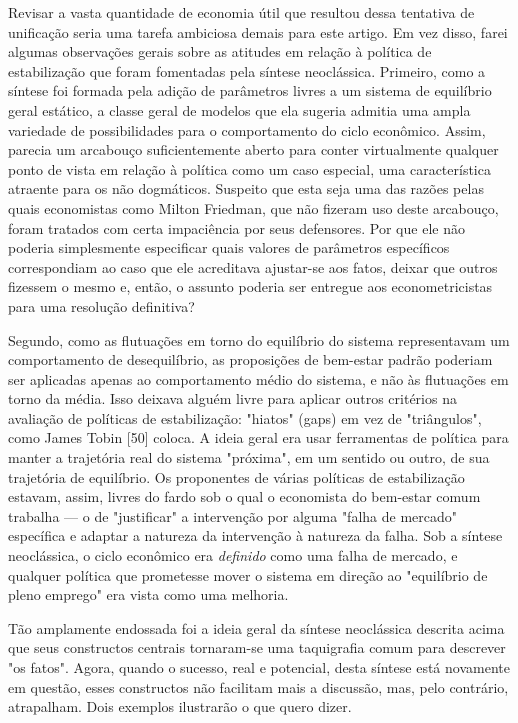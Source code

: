 \documentclass[12pt]{article}
\begin{document}
Revisar a vasta quantidade de economia útil que resultou dessa tentativa de unificação seria uma tarefa ambiciosa demais para este artigo. Em vez disso, farei algumas observações gerais sobre as atitudes em relação à política de estabilização que foram fomentadas pela síntese neoclássica. Primeiro, como a síntese foi formada pela adição de parâmetros livres a um sistema de equilíbrio geral estático, a classe geral de modelos que ela sugeria admitia uma ampla variedade de possibilidades para o comportamento do ciclo econômico. Assim, parecia um arcabouço suficientemente aberto para conter virtualmente qualquer ponto de vista em relação à política como um caso especial, uma característica atraente para os não dogmáticos. Suspeito que esta seja uma das razões pelas quais economistas como Milton Friedman, que não fizeram uso deste arcabouço, foram tratados com certa impaciência por seus defensores. Por que ele não poderia simplesmente especificar quais valores de parâmetros específicos correspondiam ao caso que ele acreditava ajustar-se aos fatos, deixar que outros fizessem o mesmo e, então, o assunto poderia ser entregue aos econometricistas para uma resolução definitiva?

Segundo, como as flutuações em torno do equilíbrio do sistema representavam um comportamento de desequilíbrio, as proposições de bem-estar padrão poderiam ser aplicadas apenas ao comportamento médio do sistema, e não às flutuações em torno da média. Isso deixava alguém livre para aplicar outros critérios na avaliação de políticas de estabilização: "hiatos" (gaps) em vez de "triângulos", como James Tobin [50] coloca. A ideia geral era usar ferramentas de política para manter a trajetória real do sistema "próxima", em um sentido ou outro, de sua trajetória de equilíbrio. Os proponentes de várias políticas de estabilização estavam, assim, livres do fardo sob o qual o economista do bem-estar comum trabalha — o de "justificar" a intervenção por alguma "falha de mercado" específica e adaptar a natureza da intervenção à natureza da falha. Sob a síntese neoclássica, o ciclo econômico era \textit{definido} como uma falha de mercado, e qualquer política que prometesse mover o sistema em direção ao "equilíbrio de pleno emprego" era vista como uma melhoria.

Tão amplamente endossada foi a ideia geral da síntese neoclássica descrita acima que seus constructos centrais tornaram-se uma taquigrafia comum para descrever "os fatos". Agora, quando o sucesso, real e potencial, desta síntese está novamente em questão, esses constructos não facilitam mais a discussão, mas, pelo contrário, atrapalham. Dois exemplos ilustrarão o que quero dizer.
\end{document}
